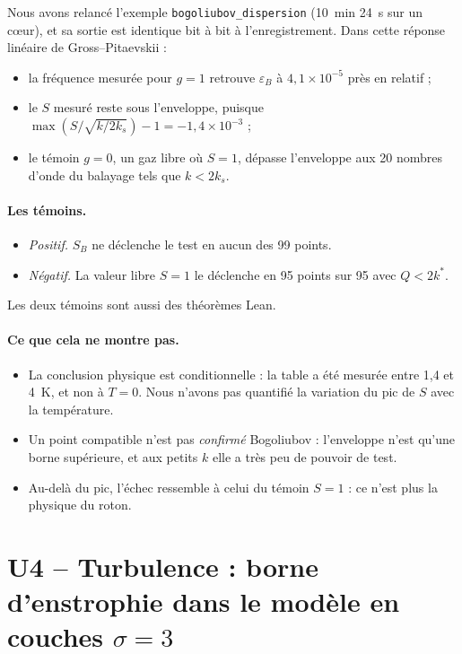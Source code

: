 Nous avons relancé l'exemple \texttt{bogoliubov\_dispersion} (10~min 24~s sur un c\oe ur), et sa sortie est
identique bit à bit à l'enregistrement. Dans cette réponse linéaire de Gross--Pitaevskii \tierX{} :
\begin{itemize}
\item la fréquence mesurée pour $g=1$ retrouve $\varepsilon_B$ à $4{,}1\times10^{-5}$ près en relatif ;
\item le $S$ mesuré reste sous l'enveloppe, puisque $\max(S/\sqrt{k/2k_s})-1=-1{,}4\times10^{-3}$ ;
\item le témoin $g=0$, un gaz libre où $S=1$, dépasse l'enveloppe aux 20 nombres d'onde du balayage tels que
$k<2k_s$.
\end{itemize}

\paragraph{Les témoins.}
\begin{itemize}
\item \emph{Positif.} $S_B$ ne déclenche le test en aucun des 99 points.
\item \emph{Négatif.} La valeur libre $S=1$ le déclenche en 95 points sur 95 avec $Q<2k^*$.
\end{itemize}
Les deux témoins sont aussi des théorèmes Lean.

\paragraph{Ce que cela ne montre pas.}
\begin{itemize}
\item La conclusion physique est conditionnelle \tierC{} : la table a été mesurée entre 1,4 et 4~K, et non à
$T=0$. Nous n'avons pas quantifié la variation du pic de $S$ avec la température.
\item Un point compatible n'est pas \emph{confirmé} \og Bogoliubov \fg{} : l'enveloppe n'est qu'une borne
supérieure, et aux petits $k$ elle a très peu de pouvoir de test.
\item Au-delà du pic, l'échec ressemble à celui du témoin $S=1$ : ce n'est plus la physique du roton.
\end{itemize}

\section[U4 -- Turbulence : borne d'enstrophie]{U4 -- Turbulence : borne d'enstrophie dans le modèle en couches \texorpdfstring{$\sigma=3$}{sigma=3}}\label{ch5:U4}


